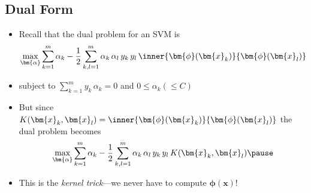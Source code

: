 
\begin{slide}
\section[-2]{Dual Form}

\begin{PauseHighLight}
  \begin{itemize}
  \item Recall that the dual problem for an SVM is
    \begin{align*}
      \max_{\bm{\alpha}} \sum_{k=1}^m \alpha_k - \frac{1}{2}
      \sum_{k,l=1}^m \alpha_k\,\alpha_l\, y_k\,y_l\,
      \inner{\bm{\phi}(\bm{x}_k)}{\bm{\phi}(\bm{x}_l)}
    \end{align*}
  \item subject to $\sum\limits_{k=1}^m y_k\,\alpha_k=0$ and $0\leq \alpha_k (\leq C)$\pause
  \item But since $K(\bm{x}_k,\bm{x}_l) = \inner{\bm{\phi}(\bm{x}_k)}{\bm{\phi}(\bm{x}_l)}$ the dual problem
    becomes
    \begin{align*}
      \max_{\bm{\alpha}} \sum_{k=1}^m \alpha_k - \frac{1}{2}
      \sum_{k,l=1}^m \alpha_k\,\alpha_l\, y_k\,y_l\,K(\bm{x}_k,\bm{x}_l)\pause
    \end{align*}
  \item This is the \emph{kernel trick}\pause---we never have to
    compute $\bm{\phi}(\bm{x})$!\pauseb
  \end{itemize}
\end{PauseHighLight}


\end{slide}



